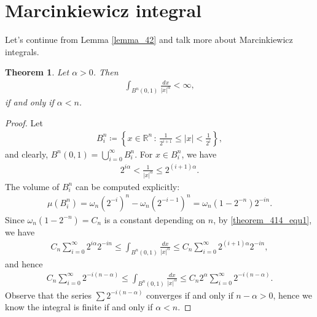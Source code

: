 \documentclass[11pt]{book}
\newtheorem{theorem}{Theorem}[chapter]
\theoremstyle{definition}
\numberwithin{equation}{chapter}
\begin{document}
\medskip

\section{Marcinkiewicz integral}

Let's continue from Lemma \ref{lemma_42} and talk more about Marcinkiewicz integrals.

\medskip

\begin{theorem}\label{theorem_414}
Let $\alpha > 0$. Then 
\begin{align*}
    \int_{B^n(0,1)} \frac{dx}{\left|x\right|^{\alpha}} < \infty,
\end{align*}
if and only if $\alpha < n$.
\end{theorem}
\begin{proof}
Let  
\begin{align*}
    B^n_i \coloneqq \left\{x \in \mathbb{R}^n \,:\, \frac{1}{2^{i+1}} \leq \left|x\right| < \frac{1}{2^i}\right\},
\end{align*}
and clearly, $B^n(0,1) = \bigcup^\infty_{i=0} B^n_i$. For $x \in B^n_i$, we have
\begin{align}\label{theorem_414_equ1}
    2^{i\alpha} < \frac{1}{\left|x\right|^{\alpha}} \leq 2^{(i+1)\alpha}.
\end{align}
The volume of $B^n_i$ can be computed explicitly:
\begin{align*}
    \mu(B^n_i) = \omega_n \left(2^{-i}\right)^n - \omega_n \left(2^{-i-1}\right)^n = \omega_n \left(1 - 2^{-n}\right) 2^{-in}.
\end{align*}
Since $\omega_n \left(1 - 2^{-n}\right) = C_n$ is a constant depending on $n$, by \eqref{theorem_414_equ1}, we have
\begin{align*}
    C_n \sum^\infty_{i=0} 2^{i\alpha} 2^{-in} \leq \int_{B^n(0,1)} \frac{dx}{\left|x\right|^{\alpha}} \leq C_n \sum^\infty_{i=0} 2^{(i+1)\alpha} 2^{-in},
\end{align*}
and hence
\begin{align*}
    C_n \sum^\infty_{i=0} 2^{-i(n-\alpha)} \leq \int_{B^n(0,1)} \frac{dx}{\left|x\right|^{\alpha}} \leq C_n 2^{\alpha} \sum^\infty_{i=0} 2^{-i(n-\alpha)}.
\end{align*}
Observe that the series $\sum 2^{-i(n-\alpha)}$ converges if and only if $n - \alpha > 0$, hence we know the integral is finite if and only if $\alpha < n$.
\end{proof}

\medskip
\end{document}
